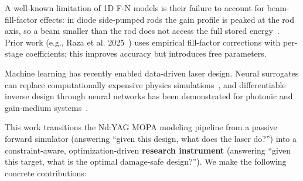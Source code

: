 \documentclass[aps,reprint,twocolumn,amsmath,amssymb,graphicx,nofootinbib]{revtex4-2}
\begin{document}
A well-known limitation of 1D F-N models is their failure to account for beam-fill-factor effects: in diode side-pumped rods the gain profile is peaked at the rod axis, so a beam smaller than the rod does not access the full stored energy~\cite{koechner2006solid}. Prior work (e.g., Raza et al. 2025~\cite{raza2025all}) uses empirical fill-factor corrections with per-stage coefficients; this improves accuracy but introduces free parameters.

Machine learning has recently enabled data-driven laser design. Neural surrogates can replace computationally expensive physics simulations~\cite{tahersima2019deep}, and differentiable inverse design through neural networks has been demonstrated for photonic and gain-medium systems~\cite{liu2021tackling, hughes2018adjoint}.

This work transitions the Nd:YAG MOPA modeling pipeline from a passive forward simulator (answering ``given this design, what does the laser do?'') into a constraint-aware, optimization-driven \textbf{research instrument} (answering ``given this target, what is the optimal damage-safe design?''). We make the following concrete contributions:
\end{document}
